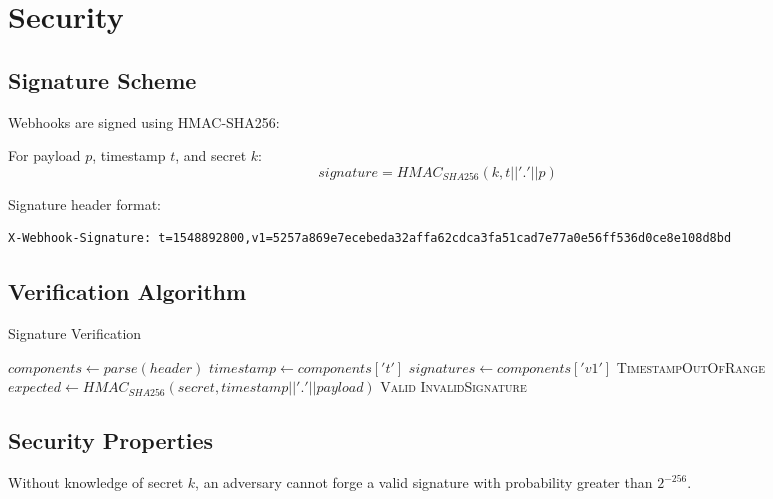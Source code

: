 \section{Security}


\subsection{Signature Scheme}

Webhooks are signed using HMAC-SHA256:

\begin{definition}
For payload $p$, timestamp $t$, and secret $k$:
\begin{equation}
signature = HMAC_{SHA256}(k, t || '.' || p)
\end{equation}
\end{definition}

Signature header format:

\begin{lstlisting}
X-Webhook-Signature: t=1548892800,v1=5257a869e7ecebeda32affa62cdca3fa51cad7e77a0e56ff536d0ce8e108d8bd
\end{lstlisting}

\subsection{Verification Algorithm}

\begin{algorithm}
\caption{Signature Verification}
\begin{algorithmic}[1]
    \State $components \gets parse(header)$
    \State $timestamp \gets components['t']$
    \State $signatures \gets components['v1']$
        \State \Return \textsc{TimestampOutOfRange}
    \EndIf
    \State $expected \gets HMAC_{SHA256}(secret, timestamp || '.' || payload)$
        \State \Return \textsc{Valid}
    \Else
        \State \Return \textsc{InvalidSignature}
    \EndIf
\EndFunction
\end{algorithmic}
\end{algorithm}

\subsection{Security Properties}

\begin{theorem}
Without knowledge of secret $k$, an adversary cannot forge a valid signature with probability greater than $2^{-256}$.
\end{theorem}


